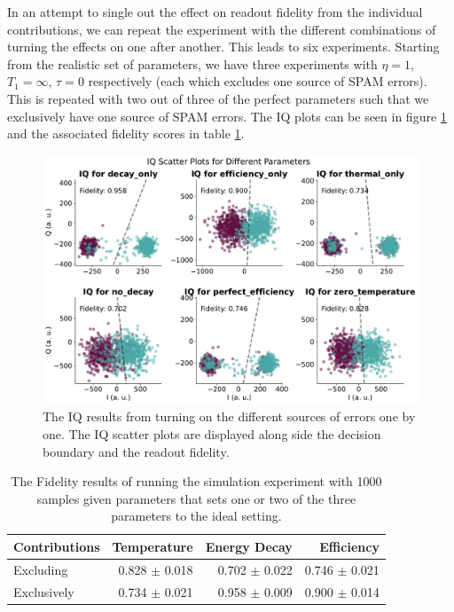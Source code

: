 In an attempt to single out the effect on readout fidelity from the individual contributions, we can repeat the experiment with the different combinations of turning the effects on one after another. This leads to six experiments. Starting from the realistic set of parameters, we have three experiments with $\eta = 1$, $T_1 = \infty$, $\tau = 0$ respectively (each which excludes one source of SPAM errors). This is repeated with two out of three of the perfect parameters such that we exclusively have one source of SPAM errors. The IQ plots can be seen in figure \ref{fig:on_off_IQ_scatter_combinations} and the associated fidelity scores in table \ref{tab:readout_infidelity_contribution_estimation}.
\begin{figure}[h]
    \centering
    \includegraphics[]{Simulations/budgets/figures/iq_scatter_budgetting_on_off.pdf}
    \caption{The IQ results from turning on the different sources of errors one by one. The IQ scatter plots are displayed along side the decision boundary and the readout fidelity.}
    \label{fig:on_off_IQ_scatter_combinations}
\end{figure}
\begin{table}[h]
\centering
\caption{The Fidelity results of running the simulation experiment with 1000 samples given parameters that sets one or two of the three parameters to the ideal setting.}
\begin{tabular}{l|rrr}
\hline
\textbf{Contributions}        & Temperature         & Energy Decay   & Efficiency  \\ \hline
Excluding                     &  0.828 $\pm$ 0.018  &  0.702 $\pm$  0.022  &  0.746 $\pm$ 0.021\\
Exclusively                   &  0.734 $\pm$ 0.021  &  0.958 $\pm$  0.009  &  0.900 $\pm$ 0.014
\end{tabular}
\vspace{0.3 cm}
\label{tab:readout_infidelity_contribution_estimation}
\end{table}

